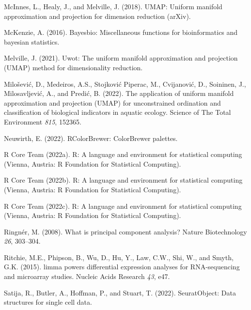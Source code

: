 \documentclass[
]{article}
\newlength{\cslhangindent}
\newlength{\cslentryspacingunit} %
\newenvironment{CSLReferences}[2] %
 {%
  \setlength{\parindent}{0pt}
  \ifodd #1
  \let\oldpar\par
  \def\par{\hangindent=\cslhangindent\oldpar}
  \fi
  \setlength{\parskip}{#2\cslentryspacingunit}
 }%
 {}
\begin{document}
\begin{CSLReferences}{0}{0}
\leavevmode{}%
McInnes, L., Healy, J., and Melville, J. (2018). UMAP: Uniform manifold
approximation and projection for dimension reduction (arXiv).

\leavevmode{}%
McKenzie, A. (2016). Bayesbio: Miscellaneous functions for
bioinformatics and bayesian statistics.

\leavevmode{}%
Melville, J. (2021). Uwot: The uniform manifold approximation and
projection (UMAP) method for dimensionality reduction.

\leavevmode{}%
Milošević, D., Medeiros, A.S., Stojković Piperac, M., Cvijanović, D.,
Soininen, J., Milosavljević, A., and Predić, B. (2022). The application
of uniform manifold approximation and projection (UMAP) for
unconstrained ordination and classification of biological indicators in
aquatic ecology. Science of The Total Environment \emph{815}, 152365.

\leavevmode{}%
Neuwirth, E. (2022). RColorBrewer: ColorBrewer palettes.

\leavevmode{}%
R Core Team (2022a). R: A language and environment for statistical
computing (Vienna, Austria: R Foundation for Statistical Computing).

\leavevmode{}%
R Core Team (2022b). R: A language and environment for statistical
computing (Vienna, Austria: R Foundation for Statistical Computing).

\leavevmode{}%
R Core Team (2022c). R: A language and environment for statistical
computing (Vienna, Austria: R Foundation for Statistical Computing).

\leavevmode{}%
Ringnér, M. (2008). What is principal component analysis? Nature
Biotechnology \emph{26}, 303--304.

\leavevmode{}%
Ritchie, M.E., Phipson, B., Wu, D., Hu, Y., Law, C.W., Shi, W., and
Smyth, G.K. (2015). {limma} powers differential expression analyses for
{RNA}-sequencing and microarray studies. Nucleic Acids Research
\emph{43}, e47.

\leavevmode{}%
Satija, R., Butler, A., Hoffman, P., and Stuart, T. (2022).
SeuratObject: Data structures for single cell data.


\end{CSLReferences}
\end{document}
